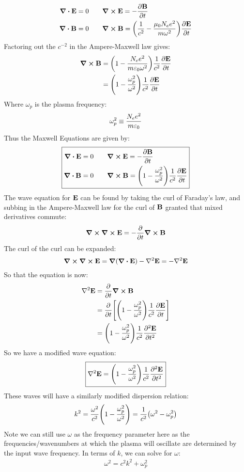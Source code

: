 \begin{align*}
  \div{\vb{E}}=0 \quad&\quad
  \curl{\vb{E}}=-\pdv{\vb{B}}{t}\\
  \div{\vb{B}}=0 \quad&\quad
  \curl{\vb{B}}=\qty(\frac1{c^2}-\frac{\mu_0N_ee^2}{m\omega^2})\pdv{\vb{E}}{t}
\end{align*}
Factoring out the $c^{-2}$ in the Ampere-Maxwell law gives:
\begin{align*}
  \curl{\vb{B}}&=\qty(1-\frac{N_ee^2}{m\varepsilon_0\omega^2})
  \frac1{c^2}\pdv{\vb{E}}{t}\\
  &=\qty(1-\frac{\omega_p^2}{\omega^2})\frac1{c^2}\pdv{\vb{E}}{t}
\end{align*}
Where $\omega_p$ is the plasma frequency:
\begin{align*}
  \omega_p^2\equiv\frac{N_ee^2}{m\varepsilon_0}
\end{align*}
Thus the Maxwell Equations are given by:
\begin{equation}
\boxed{\begin{aligned}
    \div{\vb{E}}=0 \quad&\quad
    \curl{\vb{E}}=-\pdv{\vb{B}}{t}\\
    \div{\vb{B}}=0 \quad&\quad
    \curl{\vb{B}}=\qty(1-\frac{\omega_p^2}{\omega^2})\frac1{c^2}\pdv{\vb{E}}{t}
  \end{aligned}}
\end{equation}
The wave equation for $\vb{E}$ can be found by taking the curl of Faraday's law, and subbing in the Ampere-Maxwell law for the curl of $\vb{B}$ granted that mixed derivatives commute:
\begin{align*}
  \curl{\curl{\vb{E}}}=-\pdv{t}\curl{\vb{B}}
\end{align*}
The curl of the curl can be expanded:
\begin{align*}
  \curl{\curl{\vb{E}}}=\grad{(\div{\vb{E}})}-\laplacian{\vb{E}}
  =-\laplacian{\vb{E}}
\end{align*}
So that the equation is now:
\begin{align*}
  \laplacian{\vb{E}}&=\pdv{t}\curl{\vb{B}}\\
  &=\pdv{t}\qty[
  \qty(1-\frac{\omega_p^2}{\omega^2})\frac1{c^2}\pdv{\vb{E}}{t}]\\
  &=\qty(1-\frac{\omega_p^2}{\omega^2})\frac1{c^2}\pdv[2]{\vb{E}}{t}
\end{align*}
So we have a modified wave equation:
\begin{equation}
  \boxed{\laplacian{\vb{E}}=
  \qty(1-\frac{\omega_p^2}{\omega^2})\frac1{c^2}\pdv[2]{\vb{E}}{t}}
\end{equation}
These waves will have a similarly modified dispersion relation:
\begin{align*}
  k^2=\frac{\omega^2}{c^2}\qty(1-\frac{\omega_p^2}{\omega^2})
  =\frac{1}{c^2}\qty(\omega^2-\omega_p^2)
\end{align*}
Note we can still use $\omega$ as the frequency parameter here as the frequencies/wavenumbers at which the plasma will oscillate are determined by the input wave frequency. In terms of $k$, we can solve for $\omega$:
\begin{align*}
  \omega^2=c^2k^2+\omega_p^2
\end{align*}

